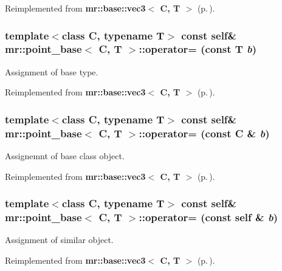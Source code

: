 Reimplemented from {\bf mr::base::vec3$<$ C, T $>$} {\rm (p.\,\pageref{structmr_1_1base_1_1vec3_z40_7})}.
\subsubsection{\setlength{\rightskip}{0pt plus 5cm}template$<$class C, typename T$>$ const {\bf self}\& {\bf mr::point\_\-base}$<$ C, T $>$::operator= (const T {\em b})\hspace{0.3cm}{\tt  [inline]}}\label{structmr_1_1point__base_z77_3}


Assignment of base type. 



Reimplemented from {\bf mr::base::vec3$<$ C, T $>$} {\rm (p.\,\pageref{structmr_1_1base_1_1vec3_z36_3})}.
\subsubsection{\setlength{\rightskip}{0pt plus 5cm}template$<$class C, typename T$>$ const {\bf self}\& {\bf mr::point\_\-base}$<$ C, T $>$::operator= (const C \& {\em b})\hspace{0.3cm}{\tt  [inline]}}\label{structmr_1_1point__base_z77_2}


Assignemnt of base class object. 



Reimplemented from {\bf mr::base::vec3$<$ C, T $>$} {\rm (p.\,\pageref{structmr_1_1base_1_1vec3_z36_2})}.
\subsubsection{\setlength{\rightskip}{0pt plus 5cm}template$<$class C, typename T$>$ const {\bf self}\& {\bf mr::point\_\-base}$<$ C, T $>$::operator= (const {\bf self} \& {\em b})\hspace{0.3cm}{\tt  [inline]}}\label{structmr_1_1point__base_z77_1}


Assignment of similar object. 



Reimplemented from {\bf mr::base::vec3$<$ C, T $>$} {\rm (p.\,\pageref{structmr_1_1base_1_1vec3_z36_1})}.
